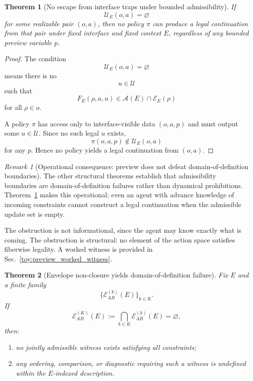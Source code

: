 \documentclass[aps,prx,onecolumn,11pt]{revtex4-2}
\theoremstyle{plain}
\newtheorem{theorem}{Theorem}
\theoremstyle{definition}
\theoremstyle{remark}
\newtheorem{remark}{Remark}
\begin{document}
\begin{theorem}[No escape from interface traps under bounded admissibility]
\label{thm:toy_preview_no_escape}
If
\[
\mathcal{U}_E(o,a)=\varnothing
\]
for some realizable pair \((o,a)\), then no policy \(\pi\) can produce
a legal continuation from that pair under fixed interface and fixed
context \(E\), regardless of any bounded preview variable \(p\).
\end{theorem}

\begin{proof}
The condition
\[
\mathcal{U}_E(o,a)=\varnothing
\]
means there is no
\[
u\in\mathcal{U}
\]
such that
\[
F_E(\rho,a,u)\in\mathcal{A}(E)\cap\mathcal{E}_E(\rho)
\]
for all \(\rho\in o\).

A policy \(\pi\) has access only to interface-visible data \((o,a,p)\)
and must output some \(u\in\mathcal{U}\). Since no such legal \(u\)
exists,
\[
\pi(o,a,p)\notin\mathcal{U}_E(o,a)
\]
for any \(p\). Hence no policy yields a legal continuation from
\((o,a)\).
\end{proof}

\begin{remark}[Operational consequence: preview does not defeat domain-of-definition boundaries]
\label{rem:preview_no_escape}
The other structural theorems establish that admissibility boundaries
are domain-of-definition failures rather than dynamical prohibitions.
Theorem~\ref{thm:toy_preview_no_escape} makes this operational: even an
agent with advance knowledge of incoming constraints cannot construct a
legal continuation when the admissible update set is empty.

The obstruction is not informational, since the agent may know exactly
what is coming. The obstruction is structural: no element of the action
space satisfies fiberwise legality. A worked witness is provided in
Sec.~\ref{toy:preview_worked_witness}.
\end{remark}

\begin{theorem}[Envelope non-closure yields domain-of-definition failure]
\label{thm:envelope_nonclosure_domain_failure}
Fix \(E\) and a finite family
\[
\{\mathcal{E}^{(k)}_{AB}(E)\}_{k\in K}.
\]
If
\[
\mathcal{E}^{(K)}_{AB}(E)
:=
\bigcap_{k\in K}\mathcal{E}^{(k)}_{AB}(E)
=
\varnothing,
\]
then:

\begin{enumerate}[label=(\roman*), leftmargin=2.2em]
\item no jointly admissible witness exists satisfying all constraints;
\item any ordering, comparison, or diagnostic requiring such a witness
is \emph{undefined} within the \(E\)-indexed description.
\end{enumerate}
\end{theorem}
\end{document}
